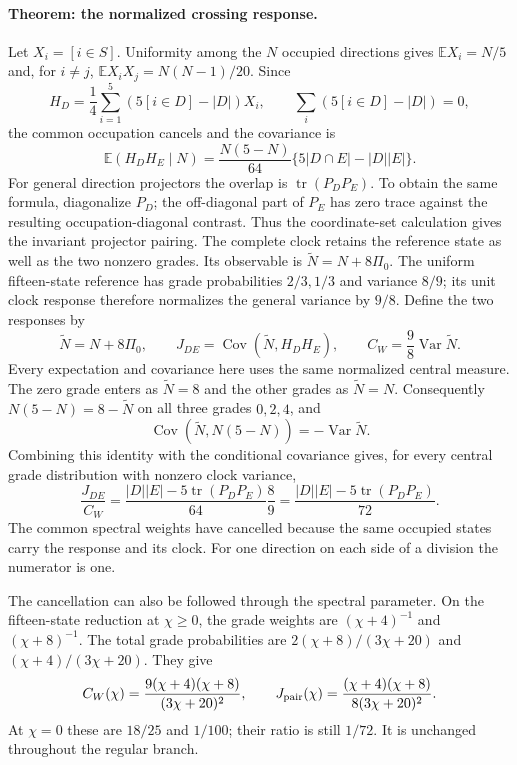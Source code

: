 \documentclass[aps,prx,onecolumn,10pt,notitlepage,nofootinbib,longbibliography]{revtex4-2}
\numberwithin{equation}{section}
\numberwithin{table}{section}
\newcommand{\EE}{\mathbb E}
\newcommand{\tr}{\operatorname{tr}}
\newcommand{\Var}{\operatorname{Var}}
\newcommand{\Cov}{\operatorname{Cov}}
\begin{document}
\paragraph*{Theorem: the normalized crossing response.}
Let $X_i=[i\in S]$. Uniformity among the $N$ occupied directions gives $\EE X_i=N/5$ and, for $i\ne j$, $\EE X_iX_j=N(N-1)/20$. Since
\[
 H_D=\frac14\sum_{i=1}^5(5[i\in D]-|D|)X_i,
 \qquad \sum_i(5[i\in D]-|D|)=0,
\]
the common occupation cancels and the covariance is
\begin{equation}
 \EE(H_DH_E\mid N)
 =\frac{N(5-N)}{64}\{5|D\cap E|-|D||E|\}.
\end{equation}
For general direction projectors the overlap is $\tr(P_DP_E)$. To obtain the same formula, diagonalize $P_D$; the off-diagonal part of $P_E$ has zero trace against the resulting occupation-diagonal contrast. Thus the coordinate-set calculation gives the invariant projector pairing.
The complete clock retains the reference state as well as the two nonzero grades. Its observable is $\widetilde N=N+8\Pi_0$. The uniform fifteen-state reference has grade probabilities $2/3,1/3$ and variance $8/9$; its unit clock response therefore normalizes the general variance by $9/8$. Define the two responses by
\begin{equation}
 \widetilde N=N+8\Pi_0,\qquad
 J_{DE}=\operatorname{Cov}(\widetilde N,H_DH_E),\qquad
 C_W=\frac98\operatorname{Var}\widetilde N.
\end{equation}
Every expectation and covariance here uses the same normalized central measure. The zero grade enters as $\widetilde N=8$ and the other grades as $\widetilde N=N$. Consequently $N(5-N)=8-\widetilde N$ on all three grades $0,2,4$, and
\begin{equation}
 \Cov(\widetilde N,N(5-N))=-\Var\widetilde N.
\end{equation}
Combining this identity with the conditional covariance gives, for every central grade distribution with nonzero clock variance,
\begin{equation}
 \frac{J_{DE}}{C_W}
 =\frac{|D||E|-5\tr(P_DP_E)}{64}\frac89
 =\frac{|D||E|-5\tr(P_DP_E)}{72}.
 \label{eq:crossing}
\end{equation}
The common spectral weights have cancelled because the same occupied states carry the response and its clock. For one direction on each side of a division the numerator is one.

The cancellation can also be followed through the spectral parameter. On the fifteen-state reduction at $\chi\geq0$, the grade weights are $(\chi+4)^{-1}$ and $(\chi+8)^{-1}$. The total grade probabilities are $2(\chi+8)/(3\chi+20)$ and $(\chi+4)/(3\chi+20)$. They give
\begin{equation}
 C_W(\chi)=\frac{9(\chi+4)(\chi+8)}{(3\chi+20)^2},\qquad
 J_{\rm pair}(\chi)=\frac{(\chi+4)(\chi+8)}{8(3\chi+20)^2}.
 \label{eq:crossingchi}
\end{equation}
At $\chi=0$ these are $18/25$ and $1/100$; their ratio is still $1/72$. It is unchanged throughout the regular branch.
\end{document}
